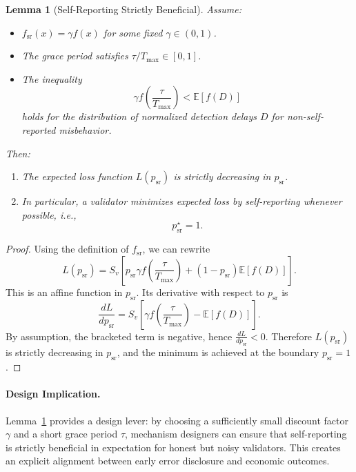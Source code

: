 \documentclass[11pt]{article}
\theoremstyle{plain}
\newtheorem{lemma}{Lemma}
\theoremstyle{definition}
\begin{document}
\begin{lemma}[Self-Reporting Strictly Beneficial]
\label{lem:self-report}
Assume:
\begin{itemize}[leftmargin=*]
  \item \(f_{\mathrm{sr}}(x) = \gamma f(x)\) for some fixed \(\gamma \in (0,1)\).
  \item The grace period satisfies \(\tau/T_{\max} \in [0,1]\).
  \item The inequality
  \[
  \gamma f\!\left(\frac{\tau}{T_{\max}}\right) < \mathbb{E}[f(D)]
  \]
  holds for the distribution of normalized detection delays \(D\) for non-self-reported misbehavior.
\end{itemize}
Then:
\begin{enumerate}[leftmargin=*]
  \item The expected loss function \(L(p_{\mathrm{sr}})\) is strictly decreasing in \(p_{\mathrm{sr}}\).
  \item In particular, a validator minimizes expected loss by self-reporting whenever possible, i.e.,
  \[
  p_{\mathrm{sr}}^\star = 1.
  \]
\end{enumerate}
\end{lemma}

\begin{proof}
Using the definition of \(f_{\mathrm{sr}}\), we can rewrite
\[
L(p_{\mathrm{sr}}) = S_v \left[ p_{\mathrm{sr}} \gamma f\!\left(\frac{\tau}{T_{\max}}\right) + (1-p_{\mathrm{sr}})\mathbb{E}[f(D)] \right].
\]
This is an affine function in \(p_{\mathrm{sr}}\). Its derivative with respect to \(p_{\mathrm{sr}}\) is
\[
\frac{dL}{dp_{\mathrm{sr}}} = S_v\left[\gamma f\!\left(\frac{\tau}{T_{\max}}\right) - \mathbb{E}[f(D)]\right].
\]
By assumption, the bracketed term is negative, hence \(\frac{dL}{dp_{\mathrm{sr}}} < 0\). Therefore \(L(p_{\mathrm{sr}})\) is strictly decreasing in \(p_{\mathrm{sr}}\), and the minimum is achieved at the boundary \(p_{\mathrm{sr}} = 1\).
\end{proof}

\paragraph{Design Implication.}
Lemma~\ref{lem:self-report} provides a design lever: by choosing a sufficiently small discount factor \(\gamma\) and a short grace period \(\tau\), mechanism designers can ensure that self-reporting is strictly beneficial in expectation for honest but noisy validators. This creates an explicit alignment between early error disclosure and economic outcomes.
\end{document}
